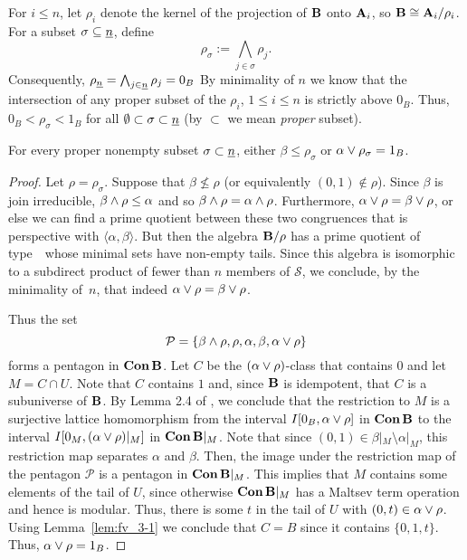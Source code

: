For $i \leq n$, let $\rho_i$ denote the kernel of the projection of $\mathbf{B}$ onto $\mathbf{A}_i$,
so $\mathbf{B} \cong \mathbf{A}_i/\rho_i$.
For a subset $\sigma \subseteq \underline{n}$, define
\[
\rho_\sigma := \bigwedge_{j\in \sigma} \rho_j.
\]
Consequently,
$\rho_{\underline{n}} = \bigwedge_{j\in \underline{n}}\rho_j = 0_{B}$
By minimality of $n$ we know that the intersection of any  proper subset of the
$\rho_i$, $1 \leq i \leq n$ is strictly above $0_B$.  Thus,
$0_B < \rho_\sigma < 1_B$ for all 
$\emptyset \subset \sigma\subset \underline{n}$
(by $\subset$ we mean \emph{proper} subset).

\begin{lemma}
  \label{lem:fv_3-2}
  For every proper nonempty subset $\sigma \subset \underline{n}$,
  either $\beta \leq \rho_\sigma$ or $\alpha \join \rho_\sigma = 1_B$.
\end{lemma}
\begin{proof} Let $\rho = \rho_\sigma$.
Suppose that $\beta \not\le {\rho}$ (or equivalently $(0,1) \notin
\rho$). Since $\beta$ is join irreducible, $\beta\meet\rho \le
\alpha$ and so $\beta\meet \rho = \alpha \meet \rho$.  Furthermore,
$\alpha\join {\rho} = \beta \join {\rho}$, or else we can find a
prime quotient between these two congruences that is perspective
with $\langle \alpha, \beta \rangle$.  But then the algebra 
$\mathbf{B}/{\rho}$ has a prime quotient of type~\atyp\ whose minimal sets have non-empty
tails.  Since this algebra is isomorphic to a subdirect product of
fewer than $n$ members of $\mathcal S$, we conclude, by the minimality 
of~$n$, that indeed $\alpha\join {\rho} = \beta \join {\rho}$.

Thus the set
\[
\mathcal P = \{\beta\meet\rho, \rho, \alpha, \beta, \alpha\join\rho\}
\]
forms a pentagon in $\operatorname{\mathbf{Con}} \mathbf{B}$. Let $C$ be the
$(\alpha\join\rho)$-class that contains $0$ and let $M = C\mathrel{\cap} U$.
Note that $C$ contains $1$ and, since $\mathbf{B}$ is idempotent,  that
$C$ is a subuniverse of $\mathbf{B}$. By Lemma 2.4 of \cite{HM:1988}, we
conclude that the restriction to $M$ is a surjective lattice
homomorphism from the interval $I[0_B,
\alpha\join\rho]$ in $\operatorname{\mathbf{Con}}{\mathbf{B}}$ to the interval $I[0_M,
(\alpha\join\rho)|_M]$ in $\operatorname{\mathbf{Con}}{\mathbf{B}}|_M$.  Note that since $(0,1) \in
\beta|_M \setminus \alpha|_M$, this restriction map separates
$\alpha$ and $\beta$.  Then, the image under the restriction map of
the pentagon $\mathcal P$ is a pentagon in $\operatorname{\mathbf{Con}}{\mathbf{B}}|_M$.  This
implies that $M$ contains some elements of the tail of $U$, since
otherwise $\operatorname{\mathbf{Con}}{\mathbf{B}}|_M$ has a Maltsev term operation and hence  
is modular.
Thus, there is some $t$ in the tail of $U$ with $(0,t) \in
\alpha\join \rho$. Using Lemma~\ref{lem:fv_3-1} we conclude that $C =
B$ since it contains $\{0,1,t\}$.  Thus, $\alpha \join \rho = 1_B$.
\end{proof}

